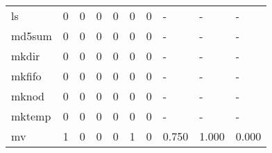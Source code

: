 \begin{longtable}{lp{1.3cm}p{1.3cm}p{1.3cm}p{1.3cm}p{1.3cm}p{1.3cm}p{1.3cm}p{1.3cm}p{1.3cm}}
ls        &                      0 &                                             0 &                                            0 &                                           0 &                                            0 &                                          0 &                                    - &                                      - &                                    - \\
md5sum    &                      0 &                                             0 &                                            0 &                                           0 &                                            0 &                                          0 &                                    - &                                      - &                                    - \\
mkdir     &                      0 &                                             0 &                                            0 &                                           0 &                                            0 &                                          0 &                                    - &                                      - &                                    - \\
mkfifo    &                      0 &                                             0 &                                            0 &                                           0 &                                            0 &                                          0 &                                    - &                                      - &                                    - \\
mknod     &                      0 &                                             0 &                                            0 &                                           0 &                                            0 &                                          0 &                                    - &                                      - &                                    - \\
mktemp    &                      0 &                                             0 &                                            0 &                                           0 &                                            0 &                                          0 &                                    - &                                      - &                                    - \\
mv        &                      1 &                                             0 &                                            0 &                                           0 &                                            1 &                                          0 &                                0.750 &                                  1.000 &                                0.000 \\

\end{longtable}
